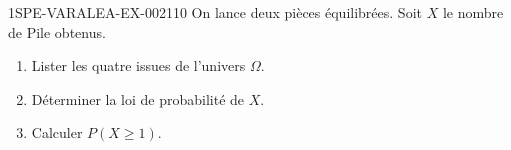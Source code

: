 \begin{exercice}{1SPE-VARALEA-EX-002}{1}{10}
On lance deux pièces équilibrées. Soit $X$ le nombre de Pile obtenus.

\begin{enumerate}
  \item Lister les quatre issues de l'univers $\Omega$.
  \item Déterminer la loi de probabilité de $X$.
  \item Calculer $P(X \geq 1)$.
\end{enumerate}
\end{exercice}
